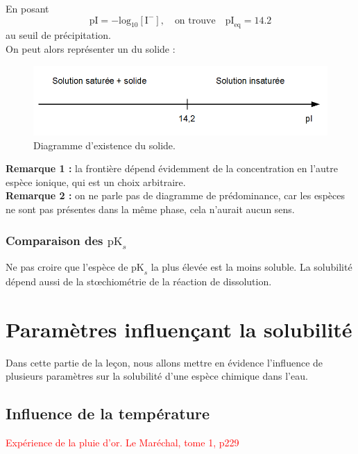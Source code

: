 \documentclass[11pt,a4paper]{report}
\begin{document}
En posant 
\begin{equation}
	\text{pI} = -\text{log}_{10} [{\text{I}^-}],\quad\text{on trouve}\quad
	\text{pI}_\text{eq} = 14.2
\end{equation}
au seuil de précipitation.\\

On peut alors représenter un  du solide :
\begin{figure}[h!]
	\begin{center}
  		\includegraphics[scale = 0.5]{diagramme_pI.png}
		\caption{Diagramme d'existence du solide.}
	\end{center}
\end{figure}

\textbf{Remarque 1 :} la frontière dépend évidemment de la concentration en l'autre espèce ionique, qui est un choix arbitraire.\\

\textbf{Remarque 2 :} on ne parle pas de diagramme de prédominance, car les espèces ne sont pas présentes dans la même phase, cela n'aurait aucun sens.

\subsubsection{Comparaison des $\text{pK}_s$}

Ne pas croire que l'espèce de $\text{pK}_s$ la plus élevée est la moins soluble. La solubilité dépend aussi de la stœchiométrie de la réaction de dissolution.


\newpage
\section{Paramètres influençant la solubilité}\label{sec:2}

Dans cette partie de la leçon, nous allons mettre en évidence l'influence de plusieurs paramètres sur la solubilité d'une espèce chimique dans l'eau.

\subsection{Influence de la température}
\textcolor{red}{Expérience de la pluie d'or. Le Maréchal, tome 1, p229}\\
\end{document}
